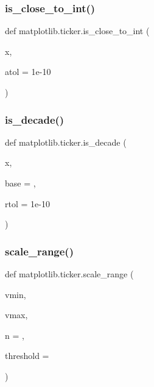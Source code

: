 \subsubsection{\texorpdfstring{is\+\_\+close\+\_\+to\+\_\+int()}{is\_close\_to\_int()}}
{\footnotesize\ttfamily def matplotlib.\+ticker.\+is\+\_\+close\+\_\+to\+\_\+int (\begin{DoxyParamCaption}\item[{}]{x,  }\item[{}]{atol = {\ttfamily 1e-\/10} }\end{DoxyParamCaption})}

\mbox{\label{namespacematplotlib_1_1ticker_a154b64486fe7bba1095ff01d22da0f22}} 
\subsubsection{\texorpdfstring{is\+\_\+decade()}{is\_decade()}}
{\footnotesize\ttfamily def matplotlib.\+ticker.\+is\+\_\+decade (\begin{DoxyParamCaption}\item[{}]{x,  }\item[{}]{base = {},  }\item[{}]{rtol = {\ttfamily 1e-\/10} }\end{DoxyParamCaption})}

\mbox{\label{namespacematplotlib_1_1ticker_ac41f01eb9c9d35af5c5c4dbd78aa230d}} 
\subsubsection{\texorpdfstring{scale\+\_\+range()}{scale\_range()}}
{\footnotesize\ttfamily def matplotlib.\+ticker.\+scale\+\_\+range (\begin{DoxyParamCaption}\item[{}]{vmin,  }\item[{}]{vmax,  }\item[{}]{n = {},  }\item[{}]{threshold = {} }\end{DoxyParamCaption})}

